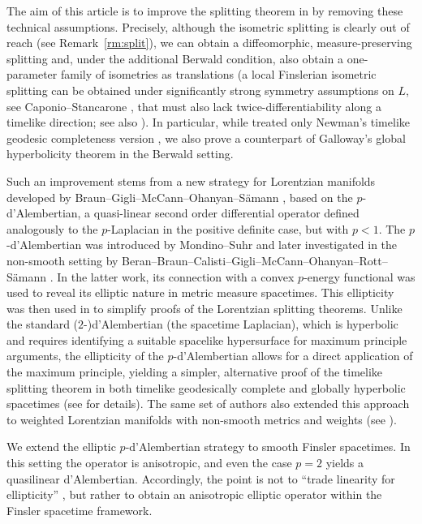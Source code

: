 \documentclass[a4paper,11pt]{article}
\numberwithin{equation}{section}
\theoremstyle{definition}
\theoremstyle{plain}
\begin{document}
The aim of this article is to improve the splitting theorem in \cite[Theorem~1.2]{LMO3} by removing these technical assumptions. Precisely, although the isometric splitting is clearly out of reach (see Remark~\ref{rm:split}), we can obtain a diffeomorphic, measure-preserving splitting and, under the  additional  Berwald condition, also obtain a one-parameter family of isometries as translations (a local Finslerian isometric splitting can be obtained under significantly strong symmetry assumptions on $L$, see Caponio--Stancarone \cite[Theorem 4.8] {CapSta18}, that must also lack twice-differentiability along a timelike direction; see also \cite[Remark 7.5]{CapCor23}).
In particular, while \cite{LMO3} treated only Newman's timelike geodesic completeness version \cite{Newman:90}, we also prove a counterpart of Galloway's global hyperbolicity theorem \cite{Galloway:89} in the Berwald setting.

Such an improvement stems from a new strategy for Lorentzian manifolds developed by Braun--Gigli--McCann--Ohanyan--Sämann \cite{quintet}, based on the $p$-d'Alembertian, a quasi-linear second order differential operator   defined analogously to the $p$-Laplacian in the positive definite case, but with $p < 1$. The $p$-d'Alembertian was introduced by Mondino--Suhr \cite{MS:22} and later investigated in the non-smooth setting by Beran--Braun--Calisti--Gigli--McCann--Ohanyan--Rott--Sämann \cite{octet}. In the latter work, its connection with a convex $p$-energy functional was used to reveal its elliptic nature in metric measure spacetimes.  This ellipticity was then used in \cite{quintet} to simplify proofs of the Lorentzian splitting theorems. 
Unlike the standard ($2$-)d'Alembertian (the spacetime Laplacian), which is hyperbolic and requires identifying a suitable spacelike hypersurface for maximum principle arguments, the  ellipticity of the $p$-d'Alembertian allows for a direct application of the maximum principle, yielding a simpler, alternative proof of the timelike splitting theorem in both timelike geodesically complete and globally hyperbolic spacetimes (see \cite{quintet} for details). The same set of authors also extended this approach to weighted Lorentzian manifolds with non-smooth metrics and weights (see \cite{quintet2}).


We extend the elliptic \(p\)-d'Alembertian strategy to smooth Finsler spacetimes.
In this setting the operator is  anisotropic, and even the case \(p=2\) yields a quasilinear d'Alembertian.
Accordingly, the point is not to ``trade linearity for ellipticity'' \cite{mccann2025}, but rather to obtain an anisotropic elliptic operator within the Finsler spacetime framework.
\end{document}
